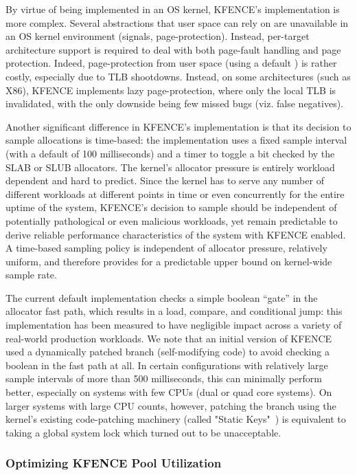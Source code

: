 By virtue of being implemented in an OS kernel, KFENCE's implementation is more
complex. Several abstractions that user space can rely on are unavailable in an
OS kernel environment (signals, page-protection). Instead, per-target
architecture support is required to deal with both page-fault handling and page
protection. Indeed, page-protection from user space (using a default
) is rather costly, especially due to TLB shootdowns.
Instead, on some architectures (such as X86), KFENCE implements lazy
page-protection, where only the local TLB is invalidated, with the only
downside being few missed bugs (viz. false negatives).

Another significant difference in KFENCE's implementation is that its decision
to sample allocations is time-based: the implementation uses a fixed sample
interval (with a default of 100 milliseconds) and a timer to toggle a bit
checked by the SLAB or SLUB allocators. The kernel's allocator pressure is
entirely workload dependent and hard to predict. Since the kernel has to serve
any number of different workloads at different points in time or even
concurrently for the entire uptime of the system, KFENCE's decision to sample
should be independent of potentially pathological or even malicious workloads,
yet remain predictable to derive reliable performance characteristics of the
system with KFENCE enabled. A time-based sampling policy is independent of
allocator pressure, relatively uniform, and therefore provides for a
predictable upper bound on kernel-wide sample rate.

The current default implementation checks a simple boolean ``gate'' in the
allocator fast path, which results in a load, compare, and conditional jump:
this implementation has been measured to have negligible impact across a
variety of real-world production workloads. We note that an initial version of
KFENCE used a dynamically patched branch (self-modifying code) to avoid
checking a boolean in the fast path at all. In certain configurations with
relatively large sample intervals of more than 500 milliseconds, this can
minimally perform better, especially on systems with few CPUs (dual or quad
core systems). On larger systems with large CPU counts, however, patching the
branch using the kernel's existing code-patching machinery (called "Static
Keys"~\cite{LinuxStaticKeys}) is equivalent to taking a global system lock
which turned out to be unacceptable.

\subsubsection{\textbf{Optimizing KFENCE Pool Utilization}}
\label{sec:kfence_bloom}

